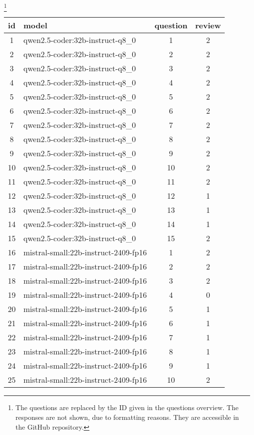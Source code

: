 \footnote{The questions are replaced by the ID given in the questions overview. The responses are not shown, due to formatting reasons. They are accessible in the GitHub repository.} 
\begin{longtable}{|c|p{7cm}|c|c|}
\toprule
id & model & question & review \\
\midrule
1 & qwen2.5-coder:32b-instruct-q8\_0 & 1 & 2 \\
2 & qwen2.5-coder:32b-instruct-q8\_0 & 2 & 2 \\
3 & qwen2.5-coder:32b-instruct-q8\_0 & 3 & 2 \\
4 & qwen2.5-coder:32b-instruct-q8\_0 & 4 & 2 \\
5 & qwen2.5-coder:32b-instruct-q8\_0 & 5 & 2 \\
6 & qwen2.5-coder:32b-instruct-q8\_0 & 6 & 2 \\
7 & qwen2.5-coder:32b-instruct-q8\_0 & 7 & 2 \\
8 & qwen2.5-coder:32b-instruct-q8\_0 & 8 & 2 \\
9 & qwen2.5-coder:32b-instruct-q8\_0 & 9 & 2 \\
10 & qwen2.5-coder:32b-instruct-q8\_0 & 10 & 2 \\
11 & qwen2.5-coder:32b-instruct-q8\_0 & 11 & 2 \\
12 & qwen2.5-coder:32b-instruct-q8\_0 & 12 & 1 \\
13 & qwen2.5-coder:32b-instruct-q8\_0 & 13 & 1 \\
14 & qwen2.5-coder:32b-instruct-q8\_0 & 14 & 1 \\
15 & qwen2.5-coder:32b-instruct-q8\_0 & 15 & 2 \\
16 & mistral-small:22b-instruct-2409-fp16 & 1 & 2 \\
17 & mistral-small:22b-instruct-2409-fp16 & 2 & 2 \\
18 & mistral-small:22b-instruct-2409-fp16 & 3 & 2 \\
19 & mistral-small:22b-instruct-2409-fp16 & 4 & 0 \\
20 & mistral-small:22b-instruct-2409-fp16 & 5 & 1 \\
21 & mistral-small:22b-instruct-2409-fp16 & 6 & 1 \\
22 & mistral-small:22b-instruct-2409-fp16 & 7 & 1 \\
23 & mistral-small:22b-instruct-2409-fp16 & 8 & 1 \\
24 & mistral-small:22b-instruct-2409-fp16 & 9 & 1 \\
25 & mistral-small:22b-instruct-2409-fp16 & 10 & 2 \\

\end{longtable}

